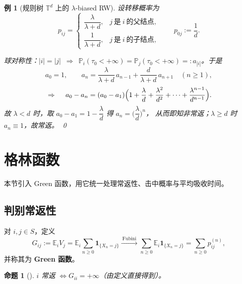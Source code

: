 \documentclass[lang=cn,10pt,newtx,thmcnt=chapter,mode=simple]{vividbook}
\providecommand{\E}{}\renewcommand{\E}{\mathbb{E}}
\providecommand{\Pp}{}\renewcommand{\Pp}{\mathbb{P}}
\newcommand{\ind}[1]{\mathbf{1}_{\{#1\}}}
\newcommand{\darr}{\;\Rightarrow\;}
\theoremstyle{vividthm}
\newtheorem*{vividproposition}{命题}
\theoremstyle{vividdef}
\theoremstyle{vividexa}
\newtheorem*{vividexample}{例}
\theoremstyle{vividrem}
\renewenvironment{proposition}[1][]{\begin{vividproposition}[#1]}{\end{vividproposition}}
\newenvironment{example}[1][]{\begin{vividexample}[#1]}{\end{vividexample}}
\begin{document}
\begin{example}[规则树 $\mathbb{T}^d$ 上的 $\lambda$-biased RW]
设转移概率为
\[
p_{ij}=
\begin{cases}
\dfrac{\lambda}{\lambda+d}, & j\ \text{是}\ i\ \text{的父结点},\\[0.5em]
\dfrac{1}{\lambda+d}, & j\ \text{是}\ i\ \text{的子结点},
\end{cases}
\qquad
p_{0j}:=\frac1d .
\]
\begin{center}
\end{center}
球对称性：$|i|=|j|\ \darr\ \Pp_i(\tau_0<+\infty)=\Pp_j(\tau_0<+\infty)=:a_{|i|}$。于是
\[
a_0=1,\qquad
a_n=\frac{\lambda}{\lambda+d}\,a_{n-1}+\frac{d}{\lambda+d}\,a_{n+1}\quad(n\ge1),
\]
\[
\darr\quad
a_0-a_n=(a_0-a_1)\Bigl(1+\frac{\lambda}{d}+\frac{\lambda^2}{d^2}+\dots+\frac{\lambda^{n-1}}{d^{n-1}}\Bigr).
\]
故 $\lambda<d$ 时，取 $a_0-a_1=1-\dfrac{\lambda}{d}$ 得 $a_n=\bigl(\dfrac{\lambda}{d}\bigr)^n$，
从而即知非常返；$\lambda\ge d$ 时 $a_n\equiv1$，故常返。 \qed
\end{example}

\section{格林函数}

本节引入 Green 函数，用它统一处理常返性、击中概率与平均吸收时间。

\subsection{判别常返性}

对 $i,j\in S$，定义
\[
G_{ij}:=\E_iV_j=\E_i\sum_{n\ge0}\ind{X_n=j}
\xrightarrow{\ \text{Fubini}\ }
\sum_{n\ge0}\E_i\ind{X_n=j}=\sum_{n\ge0}p_{ij}^{(n)},
\]
并称其为 \textbf{Green 函数}。

\begin{proposition}
$i$ 常返 $\iff G_{ii}=+\infty$（由定义直接得到）。
\end{proposition}
\end{document}
